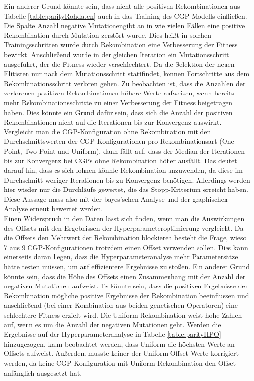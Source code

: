 Ein anderer Grund könnte sein, dass nicht alle positiven Rekombinationen aus Tabelle \ref{table:parityRohdaten} auch in das Training des CGP-Modells einfließen. 
Die Spalte \glqq Anzahl negative Mutationen\grqq\space gibt an in wie vielen Fällen eine positive Rekombination durch Mutation zerstört wurde.
Dies heißt in solchen Trainingsschritten wurde durch Rekombination eine Verbesserung der Fitness bewirkt.
Anschließend wurde in der gleichen Iteration ein Mutationsschritt ausgeführt, der die Fitness wieder verschlechtert.
Da die Selektion der neuen Elitisten nur nach dem Mutationsschritt stattfindet, können Fortschritte aus dem Rekombinationsschritt verloren gehen.
Zu beobachten ist, dass die Anzahlen der verlorenen positiven Rekombinationen höhere Werte aufweisen, wenn bereits mehr Rekombinationsschritte zu einer Verbesserung der Fitness beigetragen haben.
Dies könnte ein Grund dafür sein, dass sich die Anzahl der positiven Rekombinationen nicht auf die Iterationen bis zur Konvergenz auswirkt.
Vergleicht man die CGP-Konfiguration ohne Rekombination mit den Durchschnittswerten der CGP-Konfigurationen pro Rekombinationsart (One-Point, Two-Point und Uniform), dann fällt auf, dass der Median der Iterationen bis zur Konvergenz bei CGPs ohne Rekombination höher ausfällt. 
Das deutet darauf hin, dass es sich lohnen könnte Rekombination anzuwenden, da diese im Durchschnitt weniger Iterationen bis zu Konvergenz benötigen.
Allerdings werden hier wieder nur die Durchläufe gewertet, die das Stopp-Kriterium erreicht haben.
Diese Aussage muss also mit der bayes'schen Analyse und der graphischen Analyse erneut bewertet werden.\\
Einen Widerspruch in den Daten lässt sich finden, wenn man die Auswirkungen des Offsets mit den Ergebnissen der Hyperparameteroptimierung vergleicht.
Da die Offsets den Mehrwert der Rekombination blockieren besteht die Frage, wieso 7 aus 9 CGP-Kon\-fi\-gu\-ra\-tionen trotzdem einen Offset verwenden sollen.
Dies kann einerseits daran liegen, dass die Hyperparameteranalyse mehr Parametersätze hätte testen müssen, um auf effizientere Ergebnisse zu stoßen.
Ein anderer Grund könnte sein, dass die Höhe des Offsets einen Zusammenhang mit der Anzahl der negativen Mutationen aufweist.
Es könnte sein, dass die positiven Ergebnisse der Rekombination mögliche positive Ergebnisse der Rekombination beeinflussen und anschließend (bei einer Kombination aus beiden genetischen Operatoren) eine schlechtere Fitness erzielt wird.
Die Uniform Rekombination weist hohe Zahlen auf, wenn es um die Anzahl der negativen Mutationen geht. 
Werden die Ergebnisse auf der Hyperparameteranalyse in Tabelle \ref{table:parityHPO} hinzugezogen, kann beobachtet werden, dass Uniform die höchsten Werte an Offsets aufweist.
Außerdem musste keiner der Uniform-Offset-Werte korrigiert werden, da keine CGP-Konfiguration mit Uniform Rekombination den Offset anfänglich ausgesetzt hat.

